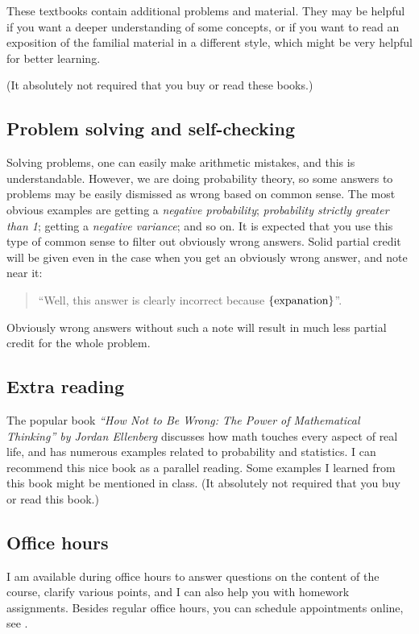 \documentclass[oneside,11pt]{amsart}
\begin{document}
These textbooks contain additional problems and material.
They may be helpful if you want a deeper understanding of
some concepts, or if you want to read an exposition of the
familial material in a different style, which might be very
helpful for better learning.

(It absolutely not required that you buy or read these books.)

\subsection{Problem solving and self-checking}
\label{sub:problem_solving}

Solving problems, one can easily make arithmetic mistakes,
and this is understandable. However, 
we are doing probability theory, so some answers to problems
may be easily dismissed as wrong
based on common sense. 
The most obvious examples are 
getting a \emph{negative probability}; \emph{probability strictly greater than 1};
getting a \emph{negative variance}; and so on.
It is expected that you use this type of common sense to filter out 
obviously wrong answers.
Solid partial credit will be given even in the case when you get an obviously
wrong answer, and note near it:
\begin{quote}
	``Well, this answer is clearly incorrect because $\{\textnormal{expanation}\}$''.
\end{quote}
Obviously wrong answers without such a note 
will result in much less partial credit for the whole problem.

\subsection{Extra reading}

The popular book
\emph{``How Not to Be Wrong: The Power of Mathematical Thinking'' by Jordan Ellenberg}
discusses how math touches every aspect of real life, and has 
numerous examples related to probability and statistics. 
I can recommend this nice book as a parallel reading. Some
examples I learned from this book might be mentioned in class.
(It absolutely not required that you buy or read this book.)

\subsection{Office hours}

I am available during office hours to answer questions on the content of the 
course, clarify various points, and I can also help you with homework assignments. 
Besides regular office hours, you can schedule appointments online, see 
.
\end{document}
